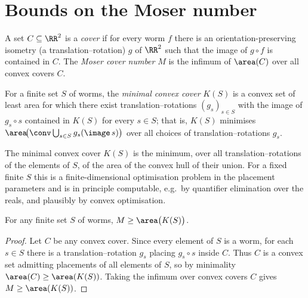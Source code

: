 \section{Bounds on the Moser number}

\begin{definition}
    \label{def:moserNumber}
    A set $C \subseteq \RR^2$ is a \emph{cover} if for every worm $f$ there is
    an orientation-preserving isometry (a translation--rotation) $g$ of $\RR^2$
    such that the image of $g \circ f$ is contained in $C$. The \emph{Moser
    cover number} $M$ is the infimum of $\area(C)$ over all convex covers $C$.
\end{definition}

\begin{definition}
    \label{def:minimalCover}
    For a finite set $S$ of worms, the \emph{minimal convex cover} $K(S)$ is a
    convex set of least area for which there exist translation--rotations
    $(g_s)_{s \in S}$ with the image of $g_s \circ s$ contained in $K(S)$ for
    every $s \in S$; that is, $K(S)$ minimises
    $\area\!\big(\conv \bigcup_{s \in S} g_s(\image\, s)\big)$ over all choices
    of translation--rotations $g_s$.
\end{definition}

\begin{remark}
    \label{rem:computeMinimalCover}
    The minimal convex cover $K(S)$ is the minimum, over all
    translation--rotations of the elements of $S$, of the area of the convex
    hull of their union. For a fixed finite $S$ this is a finite-dimensional
    optimisation problem in the placement parameters and is in principle
    computable, e.g.\ by quantifier elimination over the reals, and plausibly
    by convex optimisation.
\end{remark}

\begin{theorem}
    \label{thm:lowerBound}
    For any finite set $S$ of worms, $M \ge \area\big(K(S)\big)$.
\end{theorem}
\begin{proof}
    Let $C$ be any convex cover. Since every element of $S$ is a worm, for each
    $s \in S$ there is a translation--rotation $g_s$ placing $g_s \circ s$
    inside $C$. Thus $C$ is a convex set admitting placements of all elements of
    $S$, so by minimality $\area(C) \ge \area(K(S))$. Taking the infimum over
    convex covers $C$ gives $M \ge \area(K(S))$.
\end{proof}

